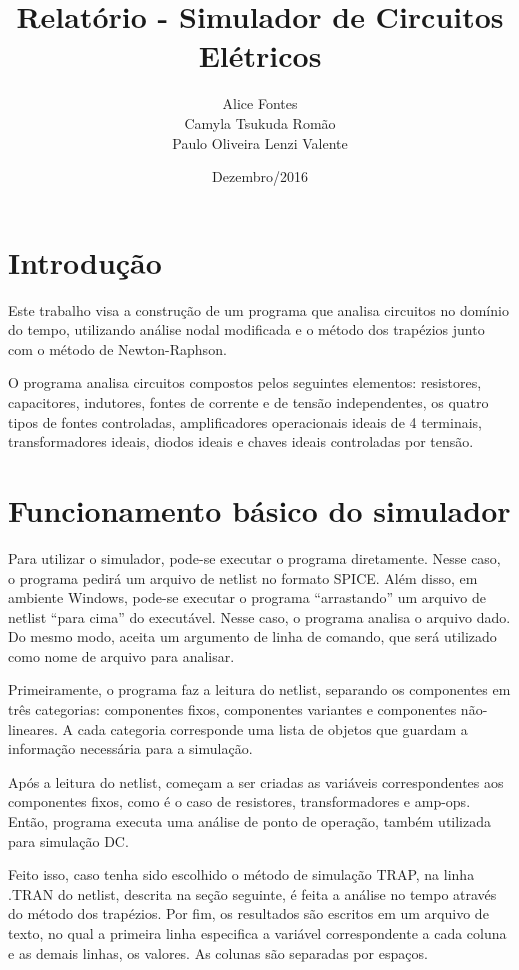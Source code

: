 \documentclass[12pt]{article}
\author{Alice Fontes\\Camyla Tsukuda Romão\\Paulo Oliveira Lenzi Valente}
\date{Dezembro/2016}
\title{Relatório - Simulador de Circuitos Elétricos}
\begin{document}
\maketitle

\pagebreak
\tableofcontents
\pagebreak
{}
\section*{Introdução}
  Este trabalho visa a construção de um programa que analisa circuitos no domínio do tempo, utilizando análise nodal modificada e o método dos trapézios junto com o método de Newton-Raphson.

	O programa analisa circuitos compostos pelos seguintes elementos: resistores, capacitores, indutores, fontes de corrente e de tensão independentes, os quatro tipos de fontes controladas, amplificadores operacionais ideais de 4 terminais, transformadores ideais, diodos ideais e chaves ideais controladas por tensão.

\section{Funcionamento básico do simulador}
  Para utilizar o simulador, pode-se executar o programa diretamente. Nesse caso, o programa pedirá um arquivo de netlist no formato SPICE. Além disso, em ambiente Windows, pode-se executar o programa “arrastando” um arquivo de netlist “para cima” do executável. Nesse caso, o programa analisa o arquivo dado. Do mesmo modo, aceita um argumento de linha de comando, que será utilizado como nome de arquivo para analisar.

	Primeiramente, o programa faz a leitura do netlist, separando os componentes em três categorias: componentes fixos, componentes variantes e componentes não-lineares. A cada categoria corresponde uma lista de objetos que guardam a informação necessária para a simulação.

	Após a leitura do netlist, começam a ser criadas as variáveis correspondentes aos componentes fixos, como é o caso de resistores, transformadores e amp-ops. Então, programa executa uma análise de ponto de operação, também utilizada para simulação DC.

Feito isso, caso tenha sido escolhido o método de simulação TRAP, na linha .TRAN do netlist, descrita na seção seguinte, é feita a análise no tempo através do método dos trapézios. Por fim, os resultados são escritos em um arquivo de texto, no qual a primeira linha especifica a variável correspondente a cada coluna e as demais linhas, os valores. As colunas são separadas por espaços.
\end{document}
